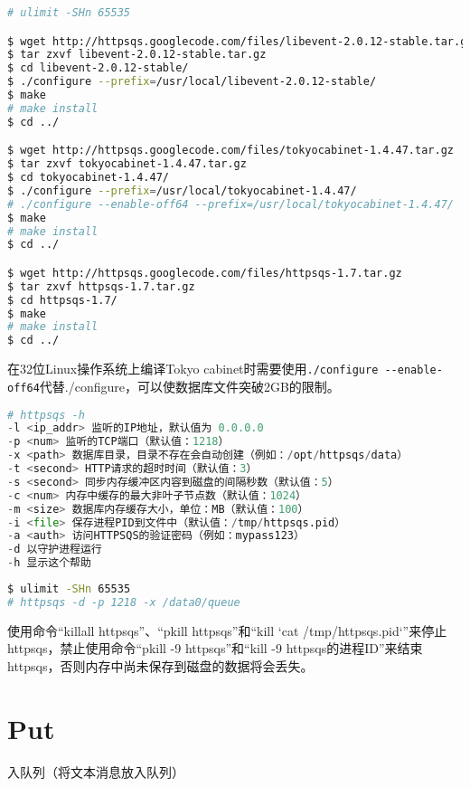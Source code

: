 \begin{lstlisting}[language=bash]
# ulimit -SHn 65535

$ wget http://httpsqs.googlecode.com/files/libevent-2.0.12-stable.tar.gz
$ tar zxvf libevent-2.0.12-stable.tar.gz
$ cd libevent-2.0.12-stable/
$ ./configure --prefix=/usr/local/libevent-2.0.12-stable/
$ make
# make install
$ cd ../

$ wget http://httpsqs.googlecode.com/files/tokyocabinet-1.4.47.tar.gz
$ tar zxvf tokyocabinet-1.4.47.tar.gz
$ cd tokyocabinet-1.4.47/
$ ./configure --prefix=/usr/local/tokyocabinet-1.4.47/
# ./configure --enable-off64 --prefix=/usr/local/tokyocabinet-1.4.47/
$ make
# make install
$ cd ../

$ wget http://httpsqs.googlecode.com/files/httpsqs-1.7.tar.gz
$ tar zxvf httpsqs-1.7.tar.gz
$ cd httpsqs-1.7/
$ make
# make install
$ cd ../
\end{lstlisting}

在32位Linux操作系统上编译Tokyo cabinet时需要使用\texttt{./configure -\/-enable-off64}代替./configure，可以使数据库文件突破2GB的限制。


\begin{lstlisting}[language=Python]
# httpsqs -h
-l <ip_addr> 监听的IP地址，默认值为 0.0.0.0 
-p <num> 监听的TCP端口（默认值：1218）
-x <path> 数据库目录，目录不存在会自动创建（例如：/opt/httpsqs/data）
-t <second> HTTP请求的超时时间（默认值：3）
-s <second> 同步内存缓冲区内容到磁盘的间隔秒数（默认值：5）
-c <num> 内存中缓存的最大非叶子节点数（默认值：1024）
-m <size> 数据库内存缓存大小，单位：MB（默认值：100）
-i <file> 保存进程PID到文件中（默认值：/tmp/httpsqs.pid）
-a <auth> 访问HTTPSQS的验证密码（例如：mypass123）
-d 以守护进程运行
-h 显示这个帮助
\end{lstlisting}




\begin{lstlisting}[language=bash]
$ ulimit -SHn 65535 
# httpsqs -d -p 1218 -x /data0/queue
\end{lstlisting}

使用命令“killall httpsqs”、“pkill httpsqs”和“kill `cat /tmp/httpsqs.pid`”来停止httpsqs，禁止使用命令“pkill -9 httpsqs”和“kill -9  httpsqs的进程ID”来结束httpsqs，否则内存中尚未保存到磁盘的数据将会丢失。


\section{Put}


入队列（将文本消息放入队列）

